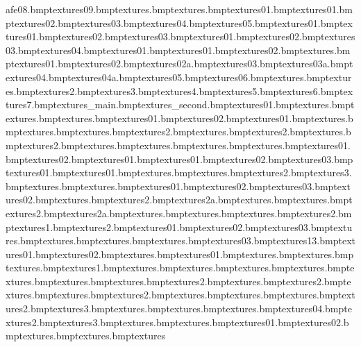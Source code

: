 afe08.bmp textures\chubsafe09.bmp textures\chubshop.bmp textures\chubtravel.bmp textures\chubtunnel01.bmp textures\chubwin01.bmp textures\chubwin02.bmp textures\chubwin03.bmp textures\chubwin04.bmp textures\chubwin05.bmp textures\chubyellow01.bmp textures\citybloom01.bmp textures\citybloom02.bmp textures\citybloom03.bmp textures\citycheese01.bmp textures\citycheese02.bmp textures\citycheese03.bmp textures\citycheese04.bmp textures\citycheesewire01.bmp textures\cityiron01.bmp textures\cityiron02.bmp textures\citymuseumfront.bmp textures\citypave01.bmp textures\citypave02.bmp textures\citypave02a.bmp textures\citypave03.bmp textures\citypave03a.bmp textures\trolleyhandle04.bmp textures\citypave04a.bmp textures\citypave05.bmp textures\citypave06.bmp textures\cityroad.bmp textures\citytarmac.bmp textures\citytarmac2.bmp textures\citytarmac3.bmp textures\citytarmac4.bmp textures\citytarmac5.bmp textures\citytarmac6.bmp textures\citytarmac7.bmp textures\city_main.bmp textures\city_second.bmp textures\claw01.bmp textures\craneblock.bmp textures\craneroof.bmp textures\crate.bmp textures\ctblue01.bmp textures\ctblue02.bmp textures\deptlight01.bmp textures\door.bmp textures\doorgroove.bmp textures\entryblue.bmp textures\fence2.bmp textures\fenceboards.bmp textures\fenceboards2.bmp textures\fencewood.bmp textures\fencewood2.bmp textures\floorsteel.bmp textures\frontgrille.bmp textures\frontlight.bmp textures\glass.bmp textures\glass01.bmp textures\trolleymesh02.bmp textures\trolleymesh01.bmp textures\glasslogo01.bmp textures\glasslogo02.bmp textures\glasslogo03.bmp textures\glassstripe01.bmp textures\glasstriple01.bmp textures\greyconcrack.bmp textures\greyconcrete.bmp textures\greyconcrete2.bmp textures\greyconcrete3.bmp textures\greyconmorta.bmp textures\ground.bmp textures\gumballpost01.bmp textures\gumballpost02.bmp textures\gumballpost03.bmp textures\gumballs02.bmp textures\gurder.bmp textures\gurder2.bmp textures\gurder2a.bmp textures\gurdera.bmp textures\gurderend.bmp textures\gurderend2.bmp textures\gurderend2a.bmp textures\gurderenda.bmp textures\gurderendgrey.bmp textures\gurdergrey.bmp textures\gurdergrey2.bmp textures\hotdog1.bmp textures\hotdog2.bmp textures\hrydrant01.bmp textures\hrydrant02.bmp textures\hrydrant03.bmp textures\hutstripesbar.bmp textures\hydraulics.bmp textures\insidefloor.bmp textures\lampostcurl.bmp textures\leading03.bmp textures\leading13.bmp textures01.bmp textures02.bmp textures\liftbumper.bmp textures\lighthalo01.bmp textures\lobbycarpet.bmp textures\lobbycarpetcol.bmp textures\lobbycarpetcorn.bmp textures\locker1.bmp textures\lorryarch.bmp textures\lorryback.bmp textures\lorrybonnet.bmp textures\lorrydash.bmp textures\lorrydoor.bmp textures\lorrydoorinside.bmp textures\lorryexhaust.bmp textures\lorryexhaust2.bmp textures\lorryfront.bmp textures\lorryfront2.bmp textures\lorryfueltank.bmp textures\lorryinter.bmp textures\lorryinter2.bmp textures\lorrymetal.bmp textures\lorrymixer.bmp textures\lorrypanels.bmp textures\lorrypanels2.bmp textures\lorrypanels3.bmp textures\lorryroof.bmp textures\lorryunder.bmp textures\lorrywindow.bmp textures\machineback04.bmp textures\manyan2.bmp textures\marbtiles3.bmp textures\marbwall.bmp textures\marbwallbord.bmp textures\market01.bmp textures\market02.bmp textures\martmat.bmp textures\mub.bmp textures